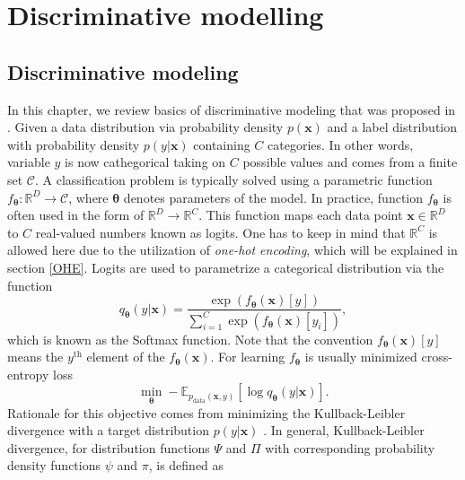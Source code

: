 \chapter{Discriminative modelling}
\section{Discriminative modeling}\label{discriminative_modelinmg}
In this chapter, we review basics of discriminative modeling that was proposed in \cite{HDGEmain}. Given a data distribution via probability density $p(\boldsymbol{x})$ and a label distribution with probability density $p(y|\boldsymbol{x})$ containing $C$ categories. In other words, variable $y$ is now cathegorical taking on $C$ possible values and comes from a finite set $\mathcal{C}$.  A classification problem is typically solved using a parametric function $f_{\boldsymbol{\theta}} : \mathbb{R}^D \to \mathcal{C}$, where $\boldsymbol{\theta}$ denotes parameters of the model. In practice, function $f_{\boldsymbol{\theta}}$ is often used in the form of $\mathbb{R}^D \to  \mathbb{R}^C$. This function maps each data point $\boldsymbol{x} \in \mathbb{R}^D$ to $C$ real-valued numbers known as logits. One has to keep in mind that $\mathbb{R}^C$ is allowed here due to the utilization of \emph{one-hot encoding}, which will be explained in section \ref{OHE}. Logits are used to parametrize a categorical distribution via the function
\begin{equation}\label{softmax}
	q_{\boldsymbol{\theta}}\left(y|\boldsymbol{x}\right) = \frac{\exp\left({f_{\boldsymbol{\theta}}\left(\boldsymbol{x}\right)[y]}\right)}{\sum_{i=1}^C\exp\left({f_{\boldsymbol{\theta}}\left(\boldsymbol{x}\right)[y_i]}\right)},
\end{equation}
which is known as the Softmax function. Note that the convention $f_{\boldsymbol{\theta}}\left(\boldsymbol{x}\right)[y]$ means the $y^{\mathrm{th}}$ element of the $f_{\boldsymbol{\theta}}\left(\boldsymbol{x}\right)$. For learning $f_{\boldsymbol{\theta}}$ is usually minimized cross-entropy loss 
\begin{equation}\label{crossentropy}
	\min_{\boldsymbol{\theta}}- \mathbb{E}_{ p_{\mathrm{data}}(\boldsymbol{x},y)}\left[\log q_{\boldsymbol{\theta}}\left(y|\boldsymbol{x}\right)\right].
\end{equation} 
Rationale for this objective comes from minimizing the Kullback-Leibler divergence with a target distribution $p(y| \boldsymbol{x})$ \cite{KL}. In general,
Kullback-Leibler divergence, for distribution functions $\Psi$ and $\Pi$ with corresponding probability density functions $\psi$ and $\pi$, is defined as
